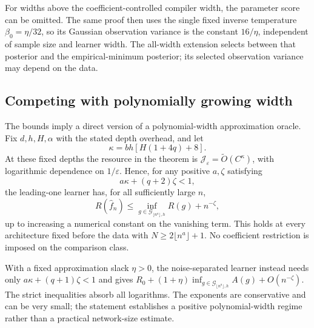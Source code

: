 For widths above the coefficient-controlled compiler width, the parameter score can be omitted. The same proof then uses the single fixed inverse temperature $\beta_0=\eta/32$, so its Gaussian observation variance is the constant $16/\eta$, independent of sample size and learner width. The all-width extension selects between that posterior and the empirical-minimum posterior; its selected observation variance may depend on the data.

\subsection{Competing with polynomially growing width}
The bounds imply a direct version of a polynomial-width approximation oracle. Fix $d,h,H,\alpha$ with the stated depth overhead, and let
\[
 \kappa=b h[H(1+4q)+8].
\]
At these fixed depths the resource in the theorem is
$\mathcal J_\varepsilon=\widetilde O(C^\kappa)$, with logarithmic dependence on $1/\varepsilon$. Hence, for any positive $a,\zeta$ satisfying
\[
 a\kappa+(q+2)\zeta<1,
\]
the leading-one learner has, for all sufficiently large $n$,
\[
 R(\widehat f_n)\le
    \inf_{g\in\mathcal G_{\lfloor n^a\rfloor,h}}R(g)+n^{-\zeta},
\]
up to increasing a numerical constant on the vanishing term. This holds at every architecture fixed before the data with
$N\ge2\lfloor n^a\rfloor+1$. No coefficient restriction is imposed on the comparison class.

With a fixed approximation slack $\eta>0$, the noise-separated learner instead needs only
$a\kappa+(q+1)\zeta<1$ and gives
$R_0+(1+\eta)\inf_{g\in\mathcal G_{\lfloor n^a\rfloor,h}}A(g)+O(n^{-\zeta})$.
The strict inequalities absorb all logarithms. The exponents are conservative and can be very small; the statement establishes a positive polynomial-width regime rather than a practical network-size estimate.
